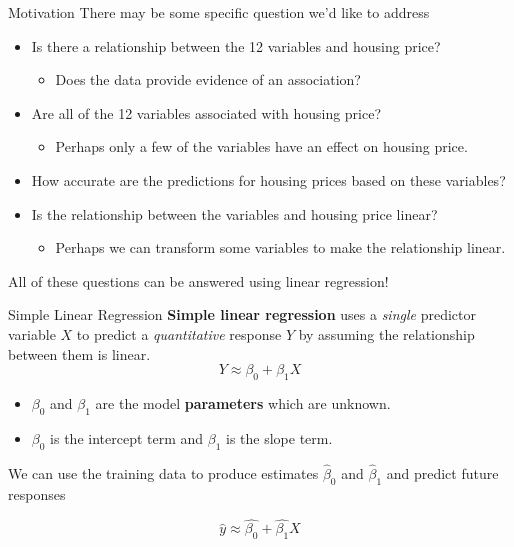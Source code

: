 \documentclass[
  ignorenonframetext,
  aspectratio=169,
]{beamer}
\providecommand{\tightlist}{%
  \setlength{\itemsep}{0pt}\setlength{\parskip}{0pt}}\usepackage{longtable,booktabs,array}
\begin{document}
\begin{frame}{Motivation}
\protect\hypertarget{motivation-1}{}
There may be some specific question we'd like to address

\begin{itemize}
\tightlist
\item
  Is there a relationship between the 12 variables and housing price?

  \begin{itemize}
  \tightlist
  \item
    Does the data provide evidence of an association?
  \end{itemize}
\item
  Are all of the 12 variables associated with housing price?

  \begin{itemize}
  \tightlist
  \item
    Perhaps only a few of the variables have an effect on housing price.
  \end{itemize}
\item
  How accurate are the predictions for housing prices based on these
  variables?
\item
  Is the relationship between the variables and housing price linear?

  \begin{itemize}
  \tightlist
  \item
    Perhaps we can transform some variables to make the relationship
    linear.
  \end{itemize}
\end{itemize}

\alert{All of these questions can be answered using linear regression!}
\end{frame}

\begin{frame}{Simple Linear Regression}
\protect\hypertarget{simple-linear-regression}{}
\textbf{Simple linear regression} uses a \emph{single} predictor
variable \(X\) to predict a \emph{quantitative} response \(Y\) by
assuming the relationship between them is linear.
\[Y \approx \beta_0 + \beta_1 X\]

\begin{itemize}
\tightlist
\item
  \(\beta_0\) and \(\beta_1\) are the model \textbf{parameters} which
  are unknown.
\item
  \(\beta_0\) is the intercept term and \(\beta_1\) is the slope term.
\end{itemize}

We can use the training data to produce estimates \(\hat \beta_0\) and
\(\hat \beta_1\) and predict future responses

\[\hat{y} \approx \hat{\beta_0} + \hat{\beta_1} X\]
\end{frame}
\end{document}

